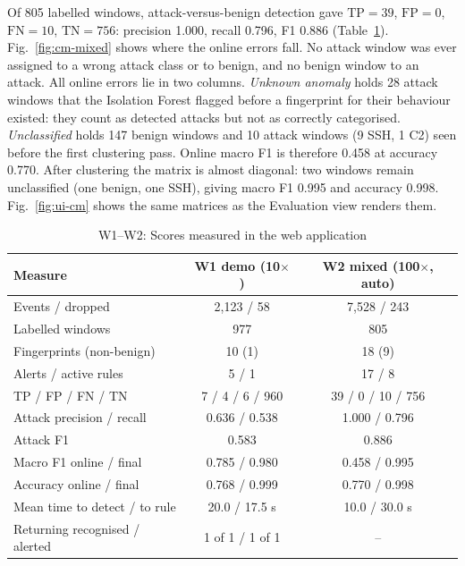 \documentclass[conference]{IEEEtran}
\begin{document}
Of 805 labelled windows, attack-versus-benign detection gave $\mathrm{TP}=39$, $\mathrm{FP}=0$, $\mathrm{FN}=10$, $\mathrm{TN}=756$: precision 1.000, recall 0.796, F1 0.886 (Table~\ref{tab:web}). Fig.~\ref{fig:cm-mixed} shows where the online errors fall. No attack window was ever assigned to a wrong attack class or to benign, and no benign window to an attack. All online errors lie in two columns. \emph{Unknown anomaly} holds 28 attack windows that the Isolation Forest flagged before a fingerprint for their behaviour existed: they count as detected attacks but not as correctly categorised. \emph{Unclassified} holds 147 benign windows and 10 attack windows (9 SSH, 1 C2) seen before the first clustering pass. Online macro F1 is therefore 0.458 at accuracy 0.770. After clustering the matrix is almost diagonal: two windows remain unclassified (one benign, one SSH), giving macro F1 0.995 and accuracy 0.998. Fig.~\ref{fig:ui-cm} shows the same matrices as the Evaluation view renders them.

\begin{table}[t]
\centering
\caption{W1--W2: Scores measured in the web application}
\label{tab:web}
\footnotesize
\setlength{\tabcolsep}{3pt}
\begin{tabular}{@{}lcc@{}}
\toprule
Measure & W1 demo (10$\times$) & W2 mixed (100$\times$, auto) \\
\midrule
Events / dropped & 2,123 / 58 & 7,528 / 243 \\
Labelled windows & 977 & 805 \\
Fingerprints (non-benign) & 10 (1) & 18 (9) \\
Alerts / active rules & 5 / 1 & 17 / 8 \\
TP / FP / FN / TN & 7 / 4 / 6 / 960 & 39 / 0 / 10 / 756 \\
Attack precision / recall & 0.636 / 0.538 & 1.000 / 0.796 \\
Attack F1 & 0.583 & 0.886 \\
Macro F1 online / final & 0.785 / 0.980 & 0.458 / 0.995 \\
Accuracy online / final & 0.768 / 0.999 & 0.770 / 0.998 \\
Mean time to detect / to rule & 20.0 / 17.5 s & 10.0 / 30.0 s \\
Returning recognised / alerted & 1 of 1 / 1 of 1 & -- \\
\bottomrule
\end{tabular}
\end{table}
\end{document}
